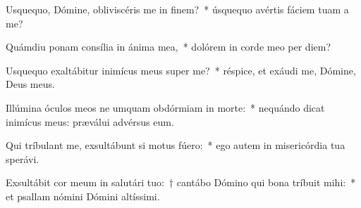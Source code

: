 \item Usquequo, Dómine, obliviscéris me in finem?~* úsquequo avértis fáciem tuam a me?

\item Quámdiu ponam consília in ánima mea,~* dolórem in corde meo per diem?

\item Usquequo exaltábitur inimícus meus super me?~* réspice, et exáudi me, Dómine, Deus meus.

\item Illúmina óculos meos ne umquam obdórmiam in morte:~* nequándo dicat inimícus meus: præválui advérsus eum.

\item Qui tríbulant me, exsultábunt si motus fúero:~* ego autem in misericórdia tua sperávi.

\item Exsultábit cor meum in salutári tuo:~† cantábo Dómino qui bona tríbuit mihi:~* et psallam nómini Dómini altíssimi.
